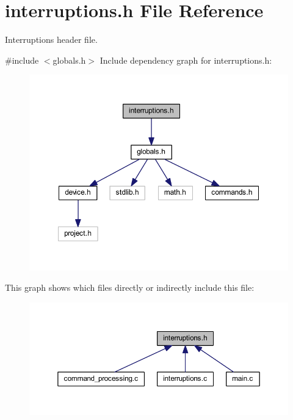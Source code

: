 \section{interruptions.\+h File Reference}
\label{interruptions_8h}


Interruptions header file.  


{\ttfamily \#include $<$globals.\+h$>$}\newline
Include dependency graph for interruptions.\+h\+:\nopagebreak
\begin{figure}[H]
\begin{center}
\leavevmode
\includegraphics[width=350pt]{interruptions_8h__incl}
\end{center}
\end{figure}
This graph shows which files directly or indirectly include this file\+:\nopagebreak
\begin{figure}[H]
\begin{center}
\leavevmode
\includegraphics[width=350pt]{interruptions_8h__dep__incl}
\end{center}
\end{figure}
